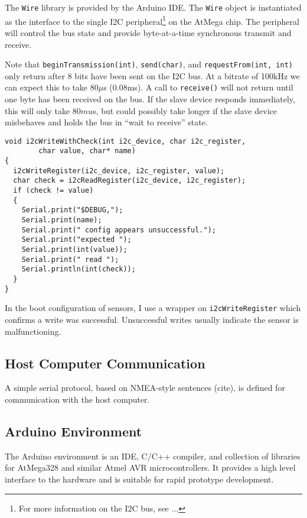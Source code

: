 \documentclass[12pt]{report}
\begin{document}
The \lstinline$Wire$ library is provided by the Arduino IDE.  The \lstinline$Wire$ object is instantiated as the interface to the single I2C peripheral\footnote{For more information on the I2C bus, see ...} on the AtMega chip. The peripheral will control the bus state and provide byte-at-a-time synchronous transmit and receive. 

Note that \lstinline$beginTransmission(int)$, \lstinline$send(char)$, and \lstinline$requestFrom(int, int)$ only return after 8 bits have been sent on the I2C bus. At a bitrate of 100kHz we can expect this to take 80$\mu$s (0.08ms). A call to \lstinline$receive()$ will not return until one byte has been received on the bus. If the slave device responds immediately, this will only take 80$mu$s, but could possibly take longer if the slave device misbehaves and holds the bus in ``wait to receive'' state.
\begin{lstlisting}
void i2cWriteWithCheck(int i2c_device, char i2c_register, 
        char value, char* name)
{
  i2cWriteRegister(i2c_device, i2c_register, value);
  char check = i2cReadRegister(i2c_device, i2c_register);
  if (check != value)
  {
    Serial.print("$DEBUG,");
    Serial.print(name);
    Serial.print(" config appears unsuccessful.");
    Serial.print("expected ");
    Serial.print(int(value));
    Serial.print(" read ");
    Serial.println(int(check));
  }
}
\end{lstlisting}
In the boot configuration of sensors, I use a wrapper on \lstinline$i2cWriteRegister$ which confirms a write was successful. Unsuccessful writes usually indicate the sensor is malfunctioning.


\subsection{Host Computer Communication}
A simple serial protocol, based on NMEA-style sentences (cite), is defined for communication with the host computer. 

\subsection{Arduino Environment}
The Arduino environment is an IDE, C/C++ compiler, and collection of libraries for AtMega328 and similar Atmel AVR microcontrollers. It provides a high level interface to the hardware and is suitable for rapid prototype development. 
\end{document}

